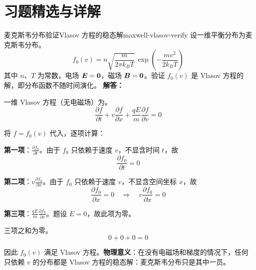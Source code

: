 
\section*{习题精选与详解}
{}

\begin{example}{麦克斯韦分布验证Vlasov 方程的稳态解}{maxwell-vlasov-verify}
设一维平衡分布为麦克斯韦分布。
\[
f_0(v) = n\sqrt{\frac{m}{2\pi k_{\!B}T}}\,\exp\!\left(-\frac{mv^2}{2k_{\!B}T}\right)
\]
其中 $n$、$T$ 为常数，电场 $\bm{E}=\bm{0}$，磁场 $\bm{B}=\bm{0}$。验证 $f_0(v)$ 是 Vlasov 方程的解，即分布函数不随时间演化。
\tcblower
\textbf{解答：}

一维 Vlasov 方程（无电磁场）为。
\[
\frac{\partial f}{\partial t} + v\frac{\partial f}{\partial x} + \frac{qE}{m}\frac{\partial f}{\partial v} = 0
\]

将 $f = f_0(v)$ 代入，逐项计算：

\textbf{第一项}：$\frac{\partial f_0}{\partial t}$。由于 $f_0$ 只依赖于速度 $v$，不显含时间 $t$，故
\[
\frac{\partial f_0}{\partial t} = 0
\]

\textbf{第二项}：$v\frac{\partial f_0}{\partial x}$。由于 $f_0$ 只依赖于速度 $v$，不显含空间坐标 $x$，故
\[
\frac{\partial f_0}{\partial x} = 0 \quad\Rightarrow\quad v\frac{\partial f_0}{\partial x} = 0
\]

\textbf{第三项}：$\frac{qE}{m}\frac{\partial f_0}{\partial v}$。题设 $E=0$，故此项为零。

三项之和为零。
\[
0 + 0 + 0 = 0
\]

因此 $f_0(v)$ 满足 Vlasov 方程。\textbf{物理意义}：在没有电磁场和梯度的情况下，任何只依赖 $v$ 的分布都是 Vlasov 方程的稳态解：麦克斯韦分布只是其中一员。

\end{example}

